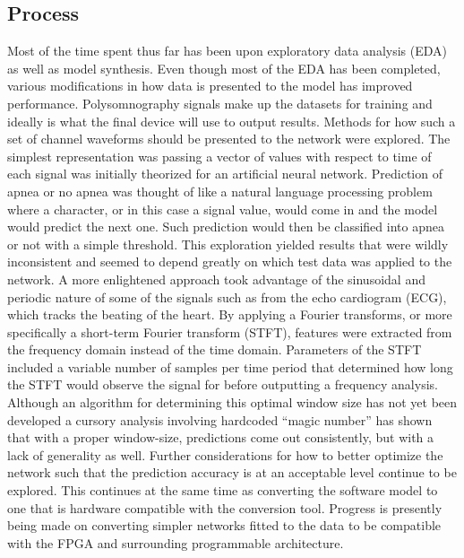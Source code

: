 \documentclass[12pt,titlepage]{article}
\begin{document}
\subsection{Process}
Most of the time spent thus far has been upon exploratory data analysis (EDA) as well as model synthesis. Even though most of the EDA has been completed, various modifications in how data is presented to the model has improved performance. Polysomnography signals make up the datasets for training and ideally is what the final device will use to output results. Methods for how such a set of channel waveforms should be presented to the network were explored. The simplest representation was passing a vector of values with respect to time of each signal was initially theorized for an artificial neural network. Prediction of apnea or no apnea was thought of like a natural language processing problem where a character, or in this case a signal value, would come in and the model would predict the next one. Such prediction would then be classified into apnea or not with a simple threshold. This exploration yielded results that were wildly inconsistent and seemed to depend greatly on which test data was applied to the network. 
A more enlightened approach took advantage of the sinusoidal and periodic nature of some of the signals such as from the echo cardiogram (ECG), which tracks the beating of the heart. By applying a Fourier transforms, or more specifically a short-term Fourier transform (STFT), features were extracted from the frequency domain instead of the time domain. Parameters of the STFT included a variable number of samples per time period that determined how long the STFT would observe the signal for before outputting a frequency analysis. Although an algorithm for determining this optimal window size has not yet been developed a cursory analysis involving hardcoded “magic number” has shown that with a proper window-size, predictions come out consistently, but with a lack of generality as well. 
Further considerations for how to better optimize the network such that the prediction accuracy is at an acceptable level continue to be explored. This continues at the same time as converting the software model to one that is hardware compatible with the conversion tool. Progress is presently being made on converting simpler networks fitted to the data to be compatible with the FPGA and surrounding programmable architecture. 
\end{document}
